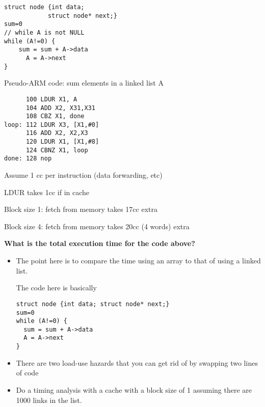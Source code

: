 \newpage
\begin{frame}[fragile]

\begin{tcolorbox}[enhanced,attach boxed title to top center={yshift=-3mm,yshifttext=-1mm},
  colback=red!5!white,colframe=red!75!black,colbacktitle=red!80!black,
  title=Try this,fonttitle=\bfseries,
  boxed title style={size=small,colframe=red!50!black} ]
{\footnotesize
\begin{multicols}{2}
\begin{verbatim}
struct node {int data;
            struct node* next;}
sum=0
// while A is not NULL
while (A!=0) { 
    sum = sum + A->data   
      A = A->next        
}
\end{verbatim}

 \columnbreak

 Pseudo-ARM code: sum elements in a linked list A
\begin{verbatim}
      100 LDUR X1, A
      104 ADD X2, X31,X31
      108 CBZ X1, done
loop: 112 LDUR X3, [X1,#0]
      116 ADD X2, X2,X3
      120 LDUR X1, [X1,#8]
      124 CBNZ X1, loop
done: 128 nop
\end{verbatim}
\end{multicols}

Assume 1 cc per instruction (data forwarding, etc)

LDUR takes 1cc if in cache

Block size 1: fetch from memory takes 17cc extra

Block size 4: fetch from memory takes 20cc (4 words) extra

\textbf{What is the total execution time for the code above?}
}

  \end{tcolorbox}


\BNotes\ifnum{}

\begin{itemize}
	\item The point here is to compare the time using an array to that
		of using a linked list.  

The code here is basically
\begin{verbatim}
struct node {int data; struct node* next;}
sum=0
while (A!=0) {
  sum = sum + A->data
  A = A->next
}
\end{verbatim}
	\item There are two load-use hazards that you can get rid of by
		swapping two lines of code
	\item Do a timing analysis with a cache with a block size of 1
		assuming there are 1000 links in the list.


\end{itemize}
\end{frame}
